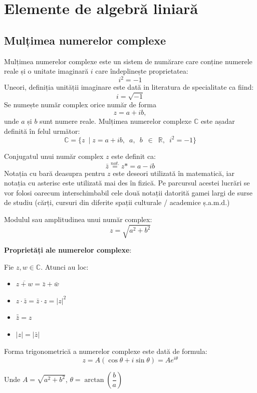 \section{Elemente de algebră liniară}

\subsection{Mulțimea numerelor complexe}

Mulțimea numerelor complexe este un sistem de numărare care conține numerele reale și o unitate imaginară $i$ care îndeplinește proprietatea:
\[i^2 = -1\]
Uneori, definiția unității imaginare este dată in literatura de specialitate ca fiind: \[i = \sqrt{-1}\]
Se numește număr complex orice număr de forma \[z = a + ib,\] unde $a$ și $b$ sunt numere reale. Mulțimea numerelor complexe $\mathbb{C}$ este așadar definită în felul următor: 
\[ \mathbb{C} = \{z \enspace|\; z = a + ib,\enspace a,\enspace b \enspace\in\enspace \mathbb{R},\enspace i^2 = -1\} \]

Conjugatul unui număr complex $z$ este definit ca:
\[\bar{z} \overset{not.}{=} z\text{*} = a - ib\]
Notația cu bară deasupra pentru $z$ este deseori utilizată în matematică, iar notația cu asterisc este utilizată mai des în fizică. Pe parcursul acestei lucrări se vor folosi oarecum interschimbabil cele două notații datorită gamei largi de surse de studiu (cărți, cursuri din diferite spații culturale / academice ș.a.m.d.)

Modulul sau amplitudinea unui număr complex:
\[z = \sqrt{a^2 + b^2}\]

\textbf{Proprietăți ale numerelor complexe}:

Fie $z, w \in \mathbb{C}$. Atunci au loc:
\begin{itemize}
    \item $\overline{z + w} = \bar{z} + \bar{w}$ 
    \item $z \cdot \bar{z} = \bar{z} \cdot z = |z|^2$
    \item $\bar{\bar{z}} = z$
    \item $|z| = |\bar{z}|$
\end{itemize}
\pagebreak

Forma trigonometrică a numerelor complexe este dată de formula:
\[z = A(\cos \theta + i \sin \theta) = Ae^{i\theta}\] 

Unde $A = \sqrt{a^2 + b^2}$,  $\theta = \arctan\left(\dfrac{b}{a}\right)$

